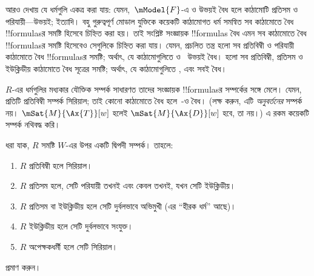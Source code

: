 \documentclass[../../../include/open-logic-section]{subfiles}
\begin{document}
 আরও দেখায় যে ধর্মগুলি একত্র করা যায়: যেমন,~$\mModel{F}$-এ  ও  উভয়ই বৈধ হলে কাঠামোটি প্রতিসম ও পরিযায়ী—উভয়ই; ইত্যাদি। বহু গুরুত্বপূর্ণ মোডাল যুক্তিকে কয়েকটি কাঠামোগত ধর্ম সমন্বিত সব কাঠামোতে বৈধ !!{formula}sর সমষ্টি হিসেবে চিহ্নিত করা হয়। তাই সংশ্লিষ্ট সংজ্ঞায়ক !!{formula}s বৈধ এমন সব কাঠামোতে বৈধ !!{formula}sর সমষ্টি হিসেবেও সেগুলিকে চিহ্নিত করা যায়। যেমন, প্রচলিত তন্ত্র  হলো সব প্রতিবিম্বী ও পরিযায়ী কাঠামোতে বৈধ !!{formula}sর সমষ্টি; অর্থাৎ, যে কাঠামোগুলিতে  ও~ উভয়ই বৈধ।  হলো সব প্রতিবিম্বী, প্রতিসম ও ইউক্লিডীয় কাঠামোতে বৈধ সূত্রের সমষ্টি; অর্থাৎ, যে কাঠামোগুলিতে ,  এবং  সবই বৈধ।

$R$-এর ধর্মগুলির মধ্যকার যৌক্তিক সম্পর্ক সাধারণত তাদের সংজ্ঞায়ক !!{formula}sর সম্পর্কের সঙ্গে মেলে। যেমন, প্রতিটি প্রতিবিম্বী সম্পর্ক সিরিয়াল; তাই কোনো কাঠামোতে  বৈধ হলে~-ও বৈধ। (লক্ষ করুন, এটি \emph{অনুবর্তনের} সম্পর্ক নয়। $\mSat{M}{\Ax{T}}[w]$ হলেই $\mSat{M}{\Ax{D}}[w]$ হবে, তা নয়।) এ রকম কয়েকটি সম্পর্ক নথিবদ্ধ করি।

\begin{prop}
  ধরা যাক, $R$ সমষ্টি $W$-এর উপর একটি দ্বিপদী সম্পর্ক। তাহলে:
  \begin{enumerate}
  \item $R$ প্রতিবিম্বী হলে সিরিয়াল।
  \item $R$ প্রতিসম হলে, সেটি পরিযায়ী তখনই এবং কেবল তখনই, যখন সেটি ইউক্লিডীয়।
  \item $R$ প্রতিসম বা ইউক্লিডীয় হলে সেটি দুর্বলভাবে অভিমুখী (এর ``হীরক ধর্ম'' আছে)।
  \item $R$ ইউক্লিডীয় হলে সেটি দুর্বলভাবে সংযুক্ত।
  \item $R$ অপেক্ষকধর্মী হলে সেটি সিরিয়াল।
  \end{enumerate}
\end{prop}

\begin{prob}
   প্রমাণ করুন।
\end{prob}
\end{document}
